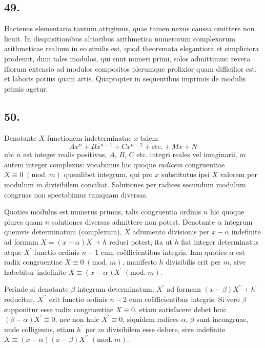 \documentclass[twoside,12pt, showframe]{memoir}
\renewcommand{\pmod}[1]{\;(\textrm{mod.}\;#1)}
\begin{document}
\subsection*{49.}
 
Hactenus elementaria tantum attigimus, quae tamen nexus caussa omittere non licuit. In disquisitionibus altioribus arithmetica numerorum complexorum arithmeticae realium in eo similis est, quod theoremata elegantiora et simpliciora prodeunt, dum tales modulos, qui sunt numeri primi, solos admittimus: revera illorum extensio ad modulos compositos plerumque prolixior quam difficilior est, et laboris potius quam artis. Quapropter in sequentibus imprimis de modulis primis agetur.

\subsection*{50.}
 
Denotante \({X}\) functionem indeterminatae \(x\) talem
\[A x^{n}+B x^{n-1}+C x^{n-2}+\text{etc.}+M x+N\]\clearpage\noindent%
ubi \(n\) est integer realis positivus, \(A\), \(B\), \(C\) etc. integri reales vel imaginarii, \(m\) autem integer complexus: vocabimus hic quoque \textit{radicem} congruentiae \(X \equiv 0\pmod{m}\) quemlibet integrum, qui pro \(x\) substitutus ipsi \(X\) valorem per modulum \(m\) divisibilem conciliat. Solutiones per radices secundum modulum congruas non spectabimus tamquam diversas.
 
Quoties modulus est numerus primus, talis congruentia ordinis \(n\) hic quoque plures quam \(n\) solutiones diversas admittere non potest. Denotante \(\alpha\) integrum quemvis determinatum (complexum), \(X\) adiumento divisionis per \(x-\alpha\) indefinite ad formam \(X=(x-\alpha) X^{\prime}+h\) reduci potest, ita ut \(h\) fiat integer determinatus atque \(X^{\prime}\) functio ordinis \(n-1\) cum coëfficientibus integris. Iam quoties \(\alpha\) est radix congruentiae \(X \equiv 0\pmod{m}\), manifesto \(h\) divisibilis erit per \(m\), sive habebitur indefinite \(X \equiv(x-\alpha) X^{\prime}\pmod{m}\).

Perinde si denotante \(\beta\) integrum determinatum, \(X^{\prime}\) ad formam \((x-\beta) X^{\prime \prime}+h^{\prime}\) reducitur, \(X^{\prime \prime}\) erit functio ordinis \(n-2\) cum coëfficientibus integris. Si vero \(\beta\) supponitur esse radix congruentiae \({X} \equiv 0\), etiam satisfacere debet huic \((\beta-\alpha) X^{\prime} \equiv 0\), nec non huic \(X^{\prime} \equiv 0\), siquidem radices \(\alpha\), \(\beta\) sunt incongruae, unde colligimus, etiam \(h^{\prime}\) per \(m\) divisibilem esse debere, sive indefinite \(X \equiv(x-\alpha)(x-\beta) X^{\prime \prime}\pmod{m}\).
 
\end{document}
